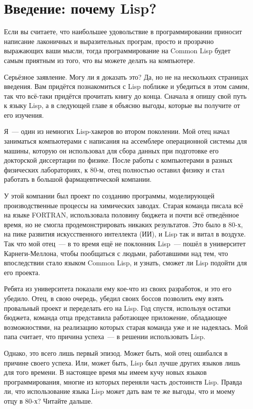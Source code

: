 \chapter{Введение: почему Lisp?}
\label{ch:01}

Если вы считаете, что наибольшее удовольствие в программировании приносит написание
лаконичных и выразительных програм, просто и прозрачно выражающих ваши мысли, тогда
программирование на Common Lisp будет самым приятным из того, что вы можете делать на
компьютере.

Серьёзное заявление. Могу ли я доказать это? Да, но не на нескольких страницах
введения. Вам придётся познакомиться с Lisp поближе и убедиться в этом самим, так что
всё-таки придётся прочитать книгу до конца. Сначала я опишу свой путь к языку Lisp, а в
следующей главе я объясню выгоды, которые вы получите от его изучения.

Я~--- один из немногих Lisp-хакеров во втором поколении. Мой отец начал заниматься
компьютерами с написания на ассемблере операционной системы для машины, которую он
использовал для сбора данных при подготовке его докторской диссертации по физике. После
работы с компьютерами в разных физических лабораториях, к 80-м, отец полностью оставил
физику и стал работать в большой фармацевтической компании.

У этой компании был проект по созданию программы, моделирующей производственные процессы
на химических заводах. Старая команда писала всё на языке FORTRAN, использовала половину бюджета и
почти всё отведённое время, но не смогла продемонстрировать никаких результатов. Это было в
80-х, на пике развития искусственного интеллекта (ИИ), и Lisp так и витал в воздухе. Так что
мой отец~--- в то время ещё не поклонник Lisp~--- пошёл в университет Карнеги-Меллона,
чтобы пообщаться с людьми, работавшими над тем, что впоследствии стало языком Common Lisp, и
узнать, сможет ли Lisp подойти для его проекта.

Ребята из университета показали ему кое-что из своих разработок, и это его убедило. Отец,
в свою очередь, убедил своих боссов позволить ему взять провальный проект и переделать его на
Lisp. Год спустя, используя остатки бюджета, команда отца представила работающее
приложение, обладающее возможностями, на реализацию которых старая команда уже и не
надеялась. Мой папа считает, что причина успеха~--- в решении использовать Lisp.

Однако, это всего лишь первый эпизод. Может быть, мой отец ошибался в причине своего
успеха. Или, может быть, Lisp был лучше других языков лишь для того времени. В настоящее
время мы имеем кучу новых языков программирования, многие из которых переняли часть
достоинств Lisp. Правда ли, что использование языка Lisp может дать вам те же выгоды,
что и моему отцу в 80-х? Читайте дальше.

